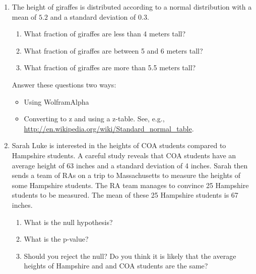 \documentclass[12pt]{article}
\begin{document}
\begin{enumerate}
\setlength{\itemsep}{-1mm}
\item The height of giraffes is distributed according to a normal
  distribution with a mean of $5.2$ and a standard deviation of
  $0.3$.  
\begin{enumerate}
\setlength{\itemsep}{-1mm}
\item What fraction of giraffes are less than 4 meters tall?
\item What fraction of giraffes are between 5 and 6 meters tall?
\item What fraction of giraffes are more than 5.5 meters tall?
\end{enumerate}
Answer these questions two ways:
\begin{itemize}
\setlength{\itemsep}{-1mm}
\item Using WolframAlpha
\item Converting to z and using a z-table. See, e.g.,
  \url{http://en.wikipedia.org/wiki/Standard_normal_table}.  
\end{itemize}

\item Sarah Luke is interested in the heights of COA students compared
  to Hampshire students.  A careful study reveals that COA students
  have an average height of 63 inches and a standard deviation of 4
  inches.  Sarah then sends a team of RAs on a trip to Massachusetts
  to measure the heights of some Hampshire students.  The RA team
  manages to convince 25 Hampshire students to be measured.  The mean
  of these 25 Hampshire students is 67 inches. 
\begin{enumerate}
\setlength{\itemsep}{-1mm}
  \item What is the null hypothesis?
  \item What is the p-value?
  \item Should you reject the null?  Do you think it is likely that
    the average heights of Hampshire and and COA students are the
    same? 
\end{enumerate}

\end{enumerate}
\end{document}
